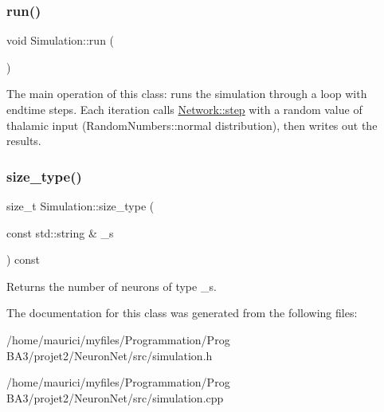 \subsubsection{\texorpdfstring{run()}{run()}}
{\footnotesize\ttfamily void Simulation\+::run (\begin{DoxyParamCaption}{ }\end{DoxyParamCaption})}

The main operation of this class\+: runs the simulation through a loop with endtime steps. Each iteration calls \hyperlink{classNetwork_a53665a3a69e6ec894c313d0ce3fb7f34}{Network\+::step} with a random value of thalamic input (Random\+Numbers\+::normal distribution), then writes out the results. \mbox{\label{classSimulation_a7d0ca858dfec187001ecbab2081f9d04}} 
\subsubsection{\texorpdfstring{size\+\_\+type()}{size\_type()}}
{\footnotesize\ttfamily size\+\_\+t Simulation\+::size\+\_\+type (\begin{DoxyParamCaption}\item[{const std\+::string \&}]{\+\_\+s }\end{DoxyParamCaption}) const}

Returns the number of neurons of type \+\_\+s. 

The documentation for this class was generated from the following files\+:\begin{DoxyCompactItemize}
\item 
/home/maurici/myfiles/\+Programmation/\+Prog B\+A3/projet2/\+Neuron\+Net/src/simulation.\+h\item 
/home/maurici/myfiles/\+Programmation/\+Prog B\+A3/projet2/\+Neuron\+Net/src/simulation.\+cpp\end{DoxyCompactItemize}
